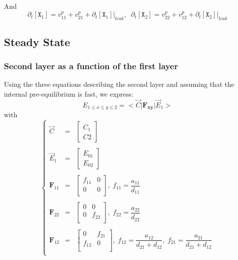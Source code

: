 \documentclass[aps,onecolumn,12pt]{revtex4}
\newcommand{\mychem}[1]{\mathtt{#1}}
\newcommand{\myconc}[1]{\left[#1\right]}
\newcommand{\spx}{\mychem{X}}
\newcommand{\mymat}[1]{{\bm{#1}}}
\begin{document}
And
\begin{equation}
	\partial_t \myconc{\spx_1} = v^p_{11}+v^p_{21} + \partial_t \myconc{\spx_1}\vert_{leak},\;\;
	\partial_t \myconc{\spx_2} = v^p_{22}+v^p_{12} + \partial_t \myconc{\spx_2}\vert_{leak}
\end{equation}

\subsection{Steady State}

\subsubsection{Second layer as a function of the first layer}


Using the three equations describing the second layer and assuming that the internal pre-equilibrium is fast, we express:
\begin{equation}
\boxed{
E_{1\leq x \leq y \leq 2 } = <{\vec{C}} \vert \mymat{F_{xy}} \vert \vec{E}_1 >
}
\end{equation}
with
\begin{equation}
\left\lbrace
\begin{array}{rcl}
\vec{C}   & = & \begin{bmatrix} C_1 \\ C2 \end{bmatrix}\\
\\
\vec{E}_1 & = & \begin{bmatrix} E_{01} \\ E_{02} \end{bmatrix}\\
\\
\mymat{F}_{11} & = & 
\begin{bmatrix}
	f_{11} & 0 \\
	0 & 0\\
\end{bmatrix}, \; f_{11} = \dfrac{a_{11}}{d_{11}}\\
\\
\mymat{F}_{22} & = & 
\begin{bmatrix}
	0 & 0 \\
	0 & f_{22}\\
\end{bmatrix}, \; f_{22} = \dfrac{a_{22}}{d_{22}}\\
\\
\mymat{F}_{12} & = & 
\begin{bmatrix}
	0 & f_{21}\\
	f_{12} & 0\\
\end{bmatrix}, \; f_{12} = \dfrac{a_{12}}{d_{21}+d_{12}},\; f_{21} = \dfrac{a_{21}}{d_{21}+d_{12}}\\
\end{array}
\right.
\end{equation}
\end{document}
